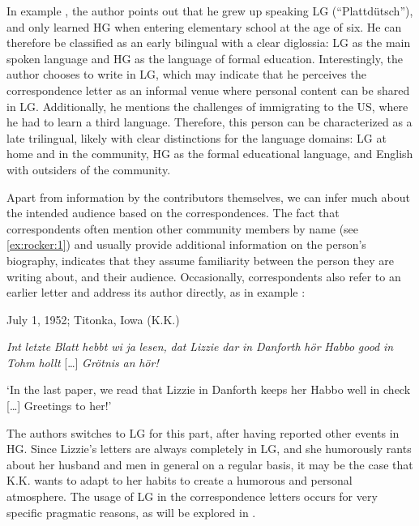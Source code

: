 \documentclass[output=paper]{langsci/langscibook}
\begin{document}
In example , the author points out that he grew up speaking LG (“Plattdütsch”), and only learned HG when entering elementary school at the age of six. He can therefore be classified as an early bilingual with a clear diglossia: LG as the main spoken language and HG as the language of formal education. Interestingly, the author chooses to write in LG, which may indicate that he perceives the correspondence letter as an informal venue where personal content can be shared in LG. Additionally, he mentions the challenges of immigrating to the US, where he had to learn a third language. Therefore, this person can be characterized as a late trilingual, likely with clear distinctions for the language domains: LG at home and in the community, HG as the formal educational language, and English with outsiders of the community.

Apart from information by the contributors themselves, we can infer much about the intended audience based on the correspondences. The fact that correspondents often mention other community members by name (see \ref{ex:rocker:1}) and usually provide additional information on the person’s biography, indicates that they assume familiarity between the person they are writing about, and their audience. Occasionally, correspondents also refer to an earlier letter and address its author directly, as in example :

\ea
\label{ex:rocker:3}
July 1, 1952; Titonka, Iowa (K.K.)\smallskip\\\relax 

\textit{Int} \textit{letzte} \textit{Blatt} \textit{hebbt} \textit{wi} \textit{ja} \textit{lesen,} \textit{dat} \textit{Lizzie} \textit{dar} \textit{in} \textit{Danforth} \textit{hör} \textit{Habbo} \textit{good} \textit{in} \textit{Tohm} \textit{hollt} […] \textit{Grötnis} \textit{an} \textit{hör!}\smallskip\\\relax 

‘In the last paper, we read that Lizzie in Danforth keeps her Habbo well in check […] Greetings to her!’
\z

The authors switches to LG for this part, after having reported other events in HG. Since Lizzie’s letters are always completely in LG, and she humorously rants about her husband and men in general on a regular basis, it may be the case that K.K. wants to adapt to her habits to create a humorous and personal atmosphere. The usage of LG in the correspondence letters occurs for very specific pragmatic reasons, as will be explored in .
\end{document}
